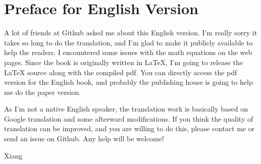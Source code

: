 \chapter*{Preface for English Version}
A lot of friends at Github asked me about this English version. I'm really sorry it takes so long to do the translation, and I'm glad to make it publicly available to help the readers. I encountered some issues with the math equations on the web pages. Since the book is originally written in LaTeX, I'm going to release the LaTeX source along with the compiled pdf. You can directly access the pdf version for the English book, and probably the publishing house is going to help me do the paper version.

As I'm not a native English speaker, the translation work is basically based on Google translation and some afterward modifications. If you think the quality of translation can be improved, and you are willing to do this, please contact me or send an issue on Github. Any help will be welcome!

Xiang